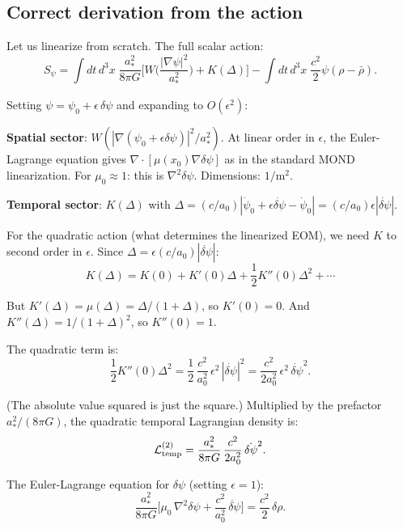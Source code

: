 \documentclass[11pt]{article}
\begin{document}
\subsection{Correct derivation from the action}

Let us linearize from scratch. The full scalar action:
\begin{equation}
S_\psi = \int dt\,d^3x\;\frac{a_*^2}{8\pi G}\biggl[
  W\!\biggl(\frac{|\nabla\psi|^2}{a_*^2}\biggr)
  + K(\Delta)
\biggr] - \int dt\,d^3x\;\frac{c^2}{2}\psi(\rho - \bar\rho).
\end{equation}

Setting $\psi = \psi_0 + \epsilon\,\delta\psi$ and expanding to $O(\epsilon^2)$:

\textbf{Spatial sector}: $W(|\nabla(\psi_0 + \epsilon\delta\psi)|^2/a_*^2)$.
At linear order in $\epsilon$, the Euler-Lagrange equation gives
$\nabla\cdot[\mu(x_0)\nabla\delta\psi]$ as in the standard MOND linearization.
For $\mu_0 \approx 1$: this is $\nabla^2\delta\psi$. Dimensions: $1/\text{m}^2$.

\textbf{Temporal sector}: $K(\Delta)$ with
$\Delta = (c/a_0)|\dot\psi_0 + \epsilon\dot{\delta\psi} - \dot\psi_0|
= (c/a_0)\epsilon|\dot{\delta\psi}|$.

For the quadratic action (what determines the linearized EOM), we need
$K$ to second order in $\epsilon$. Since $\Delta = \epsilon(c/a_0)|\dot{\delta\psi}|$:
\begin{equation}
K(\Delta) = K(0) + K'(0)\Delta + \frac{1}{2}K''(0)\Delta^2 + \cdots
\end{equation}

But $K'(\Delta) = \mu(\Delta) = \Delta/(1+\Delta)$, so $K'(0) = 0$.
And $K''(\Delta) = 1/(1+\Delta)^2$, so $K''(0) = 1$.

The quadratic term is:
\begin{equation}
\frac{1}{2}K''(0)\Delta^2 = \frac{1}{2}\,\frac{c^2}{a_0^2}\,\epsilon^2\,
|\dot{\delta\psi}|^2 = \frac{c^2}{2a_0^2}\,\epsilon^2\,\dot{\delta\psi}^2.
\end{equation}

(The absolute value squared is just the square.) Multiplied by the
prefactor $a_*^2/(8\pi G)$, the quadratic temporal Lagrangian density is:
\begin{equation}
\mathcal{L}_{\rm temp}^{(2)} = \frac{a_*^2}{8\pi G}\,\frac{c^2}{2a_0^2}\,
\dot{\delta\psi}^2.
\end{equation}

The Euler-Lagrange equation for $\delta\psi$ (setting $\epsilon = 1$):
\begin{equation}
\frac{a_*^2}{8\pi G}\biggl[\mu_0\,\nabla^2\delta\psi
+ \frac{c^2}{a_0^2}\,\ddot{\delta\psi}\biggr] = \frac{c^2}{2}\,\delta\rho.
\end{equation}
\end{document}
